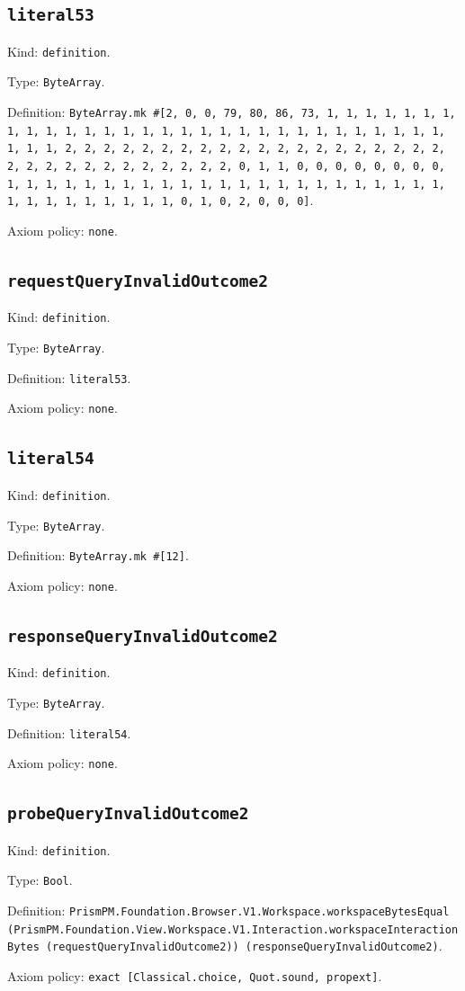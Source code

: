 \documentclass[11pt]{article}
\begin{document}
\subsection*{\texttt{literal53}}
\noindent Kind: \texttt{definition}.\par
\noindent Type: \texttt{ByteArray}.\par
\noindent Definition: \texttt{ByteArray.mk \#[2, 0, 0, 79, 80, 86, 73, 1, 1, 1, 1, 1, 1, 1, 1, 1, 1, 1, 1, 1, 1, 1, 1, 1, 1, 1, 1, 1, 1, 1, 1, 1, 1, 1, 1, 1, 1, 1, 1, 1, 2, 2, 2, 2, 2, 2, 2, 2, 2, 2, 2, 2, 2, 2, 2, 2, 2, 2, 2, 2, 2, 2, 2, 2, 2, 2, 2, 2, 2, 2, 2, 2, 0, 1, 1, 0, 0, 0, 0, 0, 0, 0, 0, 1, 1, 1, 1, 1, 1, 1, 1, 1, 1, 1, 1, 1, 1, 1, 1, 1, 1, 1, 1, 1, 1, 1, 1, 1, 1, 1, 1, 1, 1, 1, 1, 0, 1, 0, 2, 0, 0, 0]}.\par
\noindent Axiom policy: \texttt{none}.\par
\subsection*{\texttt{requestQueryInvalidOutcome2}}
\noindent Kind: \texttt{definition}.\par
\noindent Type: \texttt{ByteArray}.\par
\noindent Definition: \texttt{literal53}.\par
\noindent Axiom policy: \texttt{none}.\par
\subsection*{\texttt{literal54}}
\noindent Kind: \texttt{definition}.\par
\noindent Type: \texttt{ByteArray}.\par
\noindent Definition: \texttt{ByteArray.mk \#[12]}.\par
\noindent Axiom policy: \texttt{none}.\par
\subsection*{\texttt{responseQueryInvalidOutcome2}}
\noindent Kind: \texttt{definition}.\par
\noindent Type: \texttt{ByteArray}.\par
\noindent Definition: \texttt{literal54}.\par
\noindent Axiom policy: \texttt{none}.\par
\subsection*{\texttt{probeQueryInvalidOutcome2}}
\noindent Kind: \texttt{definition}.\par
\noindent Type: \texttt{Bool}.\par
\noindent Definition: \texttt{PrismPM.Foundation.Browser.V1.Workspace.workspaceBytesEqual (PrismPM.Foundation.View.Workspace.V1.Interaction.workspaceInteractionBytes (requestQueryInvalidOutcome2)) (responseQueryInvalidOutcome2)}.\par
\noindent Axiom policy: \texttt{exact [Classical.choice, Quot.sound, propext]}.\par
\end{document}
